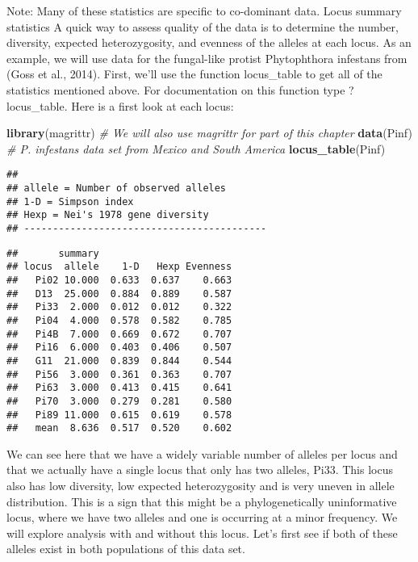 \documentclass[12pt,]{krantz}
\newenvironment{Shaded}{\begin{snugshade}}{\end{snugshade}}
\newcommand{\KeywordTok}[1]{\textcolor[rgb]{0.27,0.27,0.27}{\textbf{#1}}}
\newcommand{\CommentTok}[1]{\textcolor[rgb]{0.56,0.35,0.01}{\textit{#1}}}
\newcommand{\NormalTok}[1]{#1}
\theoremstyle{definition}
\theoremstyle{definition}
\theoremstyle{definition}
\theoremstyle{remark}
\begin{document}
Note: Many of these statistics are specific to co-dominant data. Locus
summary statistics A quick way to assess quality of the data is to
determine the number, diversity, expected heterozygosity, and evenness
of the alleles at each locus. As an example, we will use data for the
fungal-like protist Phytophthora infestans from (Goss et al., 2014).
First, we'll use the function locus\_table to get all of the statistics
mentioned above. For documentation on this function type ?locus\_table.
Here is a first look at each locus:

\begin{Shaded}
\begin{Highlighting}[]
\KeywordTok{library}\NormalTok{(magrittr)  }\CommentTok{# We will also use magrittr for part of this chapter}
\KeywordTok{data}\NormalTok{(Pinf)         }\CommentTok{# P. infestans data set from Mexico and South America}
\KeywordTok{locus_table}\NormalTok{(Pinf)}
\end{Highlighting}
\end{Shaded}

\begin{verbatim}
## 
## allele = Number of observed alleles
## 1-D = Simpson index
## Hexp = Nei's 1978 gene diversity
## ------------------------------------------
\end{verbatim}

\begin{verbatim}
##       summary
## locus  allele    1-D   Hexp Evenness
##   Pi02 10.000  0.633  0.637    0.663
##   D13  25.000  0.884  0.889    0.587
##   Pi33  2.000  0.012  0.012    0.322
##   Pi04  4.000  0.578  0.582    0.785
##   Pi4B  7.000  0.669  0.672    0.707
##   Pi16  6.000  0.403  0.406    0.507
##   G11  21.000  0.839  0.844    0.544
##   Pi56  3.000  0.361  0.363    0.707
##   Pi63  3.000  0.413  0.415    0.641
##   Pi70  3.000  0.279  0.281    0.580
##   Pi89 11.000  0.615  0.619    0.578
##   mean  8.636  0.517  0.520    0.602
\end{verbatim}

We can see here that we have a widely variable number of alleles per
locus and that we actually have a single locus that only has two
alleles, Pi33. This locus also has low diversity, low expected
heterozygosity and is very uneven in allele distribution. This is a sign
that this might be a phylogenetically uninformative locus, where we have
two alleles and one is occurring at a minor frequency. We will explore
analysis with and without this locus. Let's first see if both of these
alleles exist in both populations of this data set.
\end{document}
